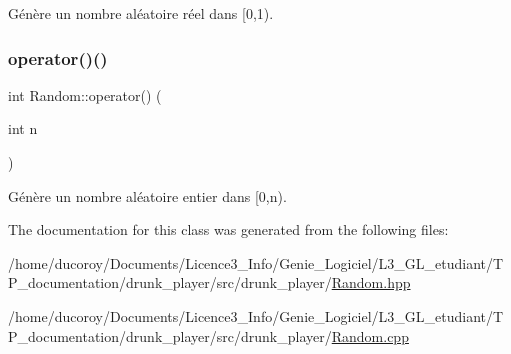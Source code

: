 Génère un nombre aléatoire réel dans \mbox{[}0,1). 

\mbox{\label{classRandom_a20265a86364664d85253931dc4685fa3}} 
\subsubsection{\texorpdfstring{operator()()}{operator()()}\hspace{0.1cm}{\footnotesize\ttfamily [2/2]}}
{\footnotesize\ttfamily int Random\+::operator() (\begin{DoxyParamCaption}\item[{int}]{n }\end{DoxyParamCaption})}



Génère un nombre aléatoire entier dans \mbox{[}0,n). 



The documentation for this class was generated from the following files\+:\begin{DoxyCompactItemize}
\item 
/home/ducoroy/\+Documents/\+Licence3\+\_\+\+Info/\+Genie\+\_\+\+Logiciel/\+L3\+\_\+\+G\+L\+\_\+etudiant/\+T\+P\+\_\+documentation/drunk\+\_\+player/src/drunk\+\_\+player/\hyperlink{Random_8hpp}{Random.\+hpp}\item 
/home/ducoroy/\+Documents/\+Licence3\+\_\+\+Info/\+Genie\+\_\+\+Logiciel/\+L3\+\_\+\+G\+L\+\_\+etudiant/\+T\+P\+\_\+documentation/drunk\+\_\+player/src/drunk\+\_\+player/\hyperlink{Random_8cpp}{Random.\+cpp}\end{DoxyCompactItemize}
